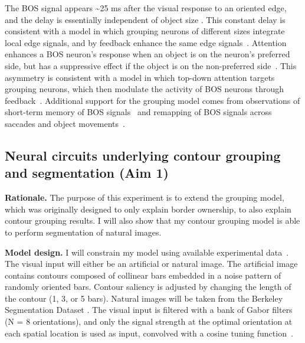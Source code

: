 \documentclass[11pt]{article}
\newcommand{\ie}[0]{{\em i.e.}\xspace}
\begin{document}
The BOS signal appears \textasciitilde 25 ms after the visual response
to an oriented edge, and the delay is essentially independent of
object size \citep{Zhou_etal00}. This constant delay is consistent with a model in which
grouping neurons of different sizes integrate local edge signals, and
by feedback enhance the same edge
signals~\citep{Craft_etal07}. Attention enhances a BOS neuron's
response when an object is on the neuron's preferred side, but has a
suppressive effect if the object is on the non-preferred
side~\citep{Qiu_etal07}. This asymmetry is consistent with a model in
which top-down attention targets grouping neurons, which then modulate
the activity of BOS neurons through
feedback~\citep{Mihalas_etal11b}. Additional support for the grouping
model comes from observations of short-term memory of BOS
signals~\citep{OHerron_vonderHeydt09} and remapping of BOS signals
across saccades and object
movements~\citep{OHerron_vonderHeydt13}.

\subsection{Neural circuits underlying contour grouping and segmentation (Aim 1)}
\textbf{Rationale.} The purpose of this experiment is to extend the grouping model, which was originally designed to only explain border ownership, to also explain contour grouping results. I will also show that my contour grouping model is able to perform segmentation of natural images.

\textbf{Model design.} I will constrain my model using available experimental data~\citep{Qiu_etal07, Chen_etal14}. The visual input will either be an artificial or natural image. The artificial image
    contains contours composed of collinear bars embedded in a noise
    pattern of randomly oriented bars.
Contour saliency is adjusted by changing the length of the contour (1,
3, or 5 bars). Natural images will be taken
    from the Berkeley Segmentation Dataset
    \citep{Martin_etal01}.
The visual input is filtered with a bank of Gabor filters (N = 8 orientations), and only the signal strength at the optimal orientation
at each spatial location is used as input, convolved with a cosine
tuning function~\citep{Piech_etal13}. 
\end{document}
